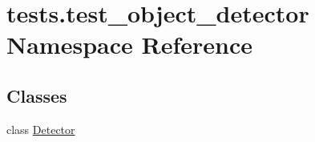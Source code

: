 \hypertarget{namespacetests_1_1test__object__detector}{}\section{tests.\+test\+\_\+object\+\_\+detector Namespace Reference}
\label{namespacetests_1_1test__object__detector}
\subsection*{Classes}
\begin{DoxyCompactItemize}
\item 
class \hyperlink{classtests_1_1test__object__detector_1_1Detector}{Detector}
\end{DoxyCompactItemize}

